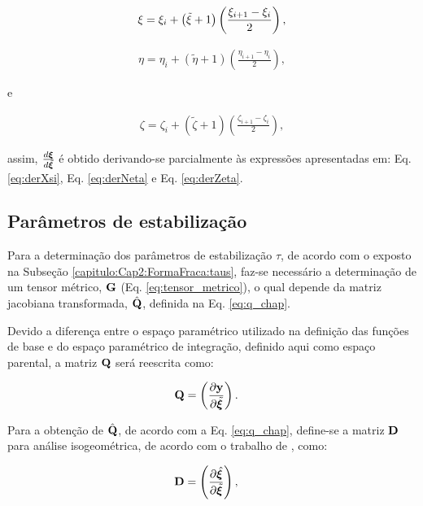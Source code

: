 \documentclass[tese_patricia]{subfiles}
\begin{document}
\begin{align}
\xi = \xi_{i} + \left(\tilde{\xi}+1\right) \left(\frac{\xi_{i+1}-\xi_{i}}{2}\right), \label{eq:derXsi}
\end{align}

\begin{align}
\eta = \eta_{i} + \left(\tilde{\eta}+1\right) \left(\frac{\eta_{i+1}-\eta_{i}}{2}\right), \label{eq:derNeta}
\end{align}

\noindent e

\begin{align}
\zeta = \zeta_{i} + \left(\tilde{\zeta}+1\right) \left(\frac{\zeta_{i+1}-\zeta_{i}}{2}\right), \label{eq:derZeta}
\end{align}

\noindent assim, $\frac{d\bm{\xi}}{d\tilde{\bm{\xi}}}$ é obtido derivando-se parcialmente às expressões apresentadas em: Eq. \ref{eq:derXsi}, Eq. \ref{eq:derNeta} e Eq. \ref{eq:derZeta}.


\subsection{Parâmetros de estabilização}\label{capitulo:Cap3:RepreGeo:taus2}

Para a determinação dos parâmetros de estabilização $\tau$, de acordo com o exposto na Subseção \ref{capitulo:Cap2:FormaFraca:taus}, faz-se necessário a determinação de um tensor métrico, $\mathbf{G}$ (Eq. \ref{eq:tensor_metrico}), o qual depende da matriz jacobiana transformada, $\hat{\mathbf{Q}}$, definida na Eq. \ref{eq:q_chap}.

Devido a diferença entre o espaço paramétrico utilizado na definição das funções de base e do espaço paramétrico de integração, definido aqui como espaço parental, a matriz $\mathbf{Q}$ será reescrita como:

\begin{align}
	\mathbf{Q}&=\left(\frac{\partial\mathbf{y}}{\partial\tilde{\bm{\xi}}}\right).
\end{align}

Para a obtenção de $\hat{\mathbf{Q}}$, de acordo com a Eq. \ref{eq:q_chap}, define-se a matriz $\mathbf{D}$ para análise isogeométrica, de acordo com o trabalho de , como:

\begin{align}
	\mathbf{D}&=\left(\frac{\partial\hat{\bm{\xi}}}{\partial\tilde{\bm{\xi}}}\right),
\end{align}
\end{document}
